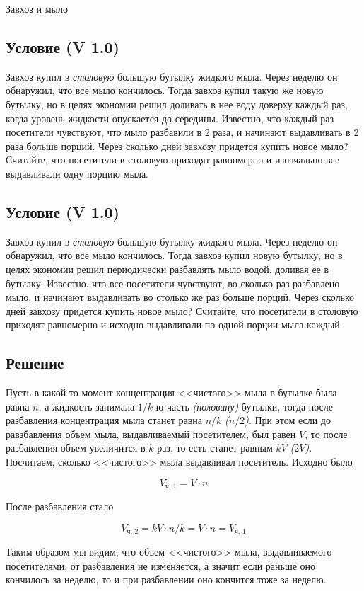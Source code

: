 


\begin{center}
{\large Завхоз и мыло\\
}
\end{center}

\subsection*{Условие (V 1.0)}

Завхоз купил в {\itshape столовую} большую бутылку жидкого мыла. Через неделю он обнаружил, что все мыло кончилось. Тогда завхоз купил такую же новую бутылку, но в целях экономии решил доливать в нее воду доверху каждый раз, когда уровень жидкости опускается до середины. Известно, что каждый раз посетители чувствуют, что мыло разбавили в 2 раза, и начинают выдавливать в 2 раза больше порций. Через сколько дней завхозу придется купить новое мыло? Считайте, что посетители в столовую приходят равномерно и изначально все выдавливали одну порцию мыла.

\subsection*{Условие (V 1.0)}

Завхоз купил в {\itshape столовую} большую бутылку жидкого мыла. Через неделю он обнаружил, что все мыло кончилось. Тогда завхоз купил новую бутылку, но в целях экономии решил периодически разбавлять мыло водой, доливая ее в бутылку. Известно, что все посетители чувствуют, во сколько раз разбавлено мыло, и начинают выдавливать во столько же раз больше порций. Через сколько дней завхозу придется купить новое мыло? Считайте, что посетители в столовую приходят равномерно и исходно выдавливали по одной порции мыла каждый.

\subsection*{Решение}

Пусть в какой-то момент концентрация <<чистого>> мыла в бутылке была равна $n$, а жидкость занимала $1/k$-ю часть {\itshape (половину)} бутылки, тогда после разбавления концентрация мыла станет равна  $n/k$ {\itshape ($n/2$)}. При этом если до равзбавления объем мыла, выдавливаемый посетителем, был равен $V$, то после разбавления объем увеличится в $k$ раз, то есть станет равным $k V$ {\itshape ($2 V$)}. Посчитаем, сколько <<чистого>> мыла выдавливал посетитель. Исходно было 

\begin{equation}
V_\text{ч, 1} = V \cdot n
\end{equation}

После разбавления стало

\begin{equation}
V_\text{ч, 2} = k V \cdot n / k = V \cdot n = V_\text{ч, 1}
\end{equation}

Таким образом мы видим, что объем <<чистого>> мыла, выдавливаемого посетителями, от разбавления не изменяется, а значит если раньше оно кончилось за неделю, то и при разбавлении оно кончится тоже за неделю.



